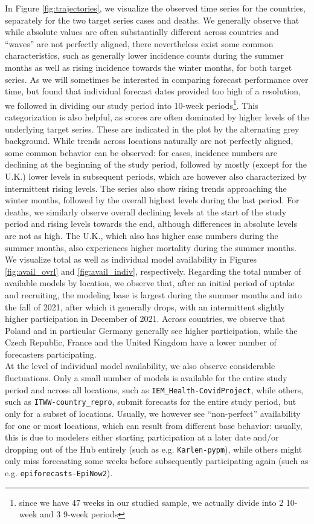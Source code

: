 In Figure \ref{fig:trajectories}, we visualize the observed time series for the countries, separately for the two target series cases and deaths. We generally observe that while absolute values are often substantially different across countries and ``waves'' are not perfectly aligned, there nevertheless exist some common characteristics, such as generally lower incidence counts during the summer months as well as rising incidence towards the winter months, for both target series. As we will sometimes be interested in comparing forecast performance over time, but found that individual forecast dates provided too high of a resolution, we followed \cite{taylor_combining_2021} in dividing our study period into 10-week periods\footnote{since we have 47 weeks in our studied sample, we actually divide into 2 10-week and 3 9-week periods}. This categorization is also helpful, as scores are often dominated by higher levels of the underlying target series. These are indicated in the plot by the alternating grey background. While trends across locations naturally are not perfectly aligned, some common behavior can be observed: for cases, incidence numbers are declining at the beginning of the study period, followed by mostly (except for the U.K.) lower levels in subsequent periods, which are however also characterized by intermittent rising levels. The series also show rising trends approaching the winter months, followed by the overall highest levels during the last period. For deaths, we similarly observe overall declining levels at the start of the study period and rising levels towards the end, although differences in absolute levels are not as high. The U.K., which also has higher case numbers during the summer months, also experiences higher mortality during the summer months.\\
We visualize total as well as individual model availability in Figures \ref{fig:avail_ovrl} and \ref{fig:avail_indiv}, respectively. Regarding the total number of available models by location, we observe that, after an initial period of uptake and recruiting, the modeling base is largest during the summer months and into the fall of 2021, after which it generally drops, with an intermittent slightly higher participation in December of 2021. Across countries, we observe that Poland and in particular Germany generally see higher participation, while the Czech Republic, France and the United Kingdom have a lower number of forecasters participating.\\
At the level of individual model availability, we also observe considerable fluctuations. Only a small number of models is available for the entire study period and across all locations, such as \texttt{IEM\_Health-CovidProject}, while others, such as \texttt{ITWW-country\_repro}, submit forecasts for the entire study period, but only for a subset of locations. Usually, we however see ``non-perfect'' availability for one or most locations, which can result from different base behavior: usually, this is due to modelers either starting participation at a later date and/or dropping out of the Hub entirely (such as e.g. \texttt{Karlen-pypm}), while others might only miss forecasting some weeks before subsequently participating again (such as e.g. \texttt{epiforecasts-EpiNow2}).
